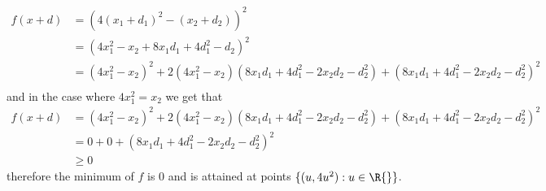\documentclass{article}
\begin{document}
\begin{tasks}
\begin{enumerate}[label={\color{tcum}P \arabic{week}.\arabic*}]
{\begin{enumerate}
\begin{displaymath}
                            \begin{aligned}
                                f(x+d) 
                                &= (4(x_1+d_1)^2-(x_2+d_2))^2 \\
                                &= (4x_1^2-x_2+8x_1d_1+4d_1^2-d_2)^2 \\
                                &= (4x_1^2-x_2)^2+2(4x_1^2-x_2)(8x_1d_1+4d_1^2-2x_2d_2-d_2^2)+(8x_1d_1+4d_1^2-2x_2d_2-d_2^2)^2 \\
                            \end{aligned}
                        \end{displaymath}
                        and in the case where \(4x_1^2=x_2\) we get that
                        \begin{displaymath}
                            \begin{aligned}
                                f(x+d) 
                                &= (4x_1^2-x_2)^2+2(4x_1^2-x_2)(8x_1d_1+4d_1^2-2x_2d_2-d_2^2)+(8x_1d_1+4d_1^2-2x_2d_2-d_2^2)^2 \\
                                &= 0+0+(8x_1d_1+4d_1^2-2x_2d_2-d_2^2)^2 \\
                                &\ge 0
                            \end{aligned}
                        \end{displaymath}
                        therefore the minimum of \(f\) is \(0\) and is attained at points \(\{(u, 4u^2) : u\in\R{}\}\). 
                \end{enumerate}}



\end{enumerate}
\end{tasks}
\end{document}
